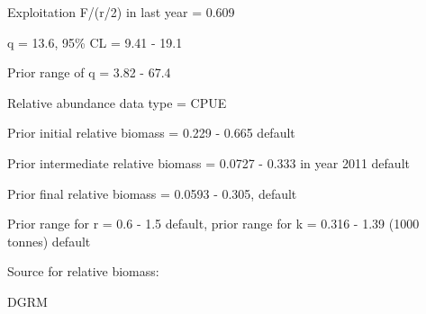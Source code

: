 \documentclass[12pt,a4paper]{article}\usepackage[]{graphicx}\usepackage[]{xcolor}
\begin{document}
Exploitation F/(r/2) in last year = 0.609

q = 13.6, 95\% CL = 9.41 - 19.1

Prior range of q = 3.82 - 67.4

Relative abundance data type = CPUE

Prior initial relative biomass = 0.229 - 0.665 default

Prior intermediate relative biomass = 0.0727 - 0.333 in year 2011 default

Prior final relative biomass = 0.0593 - 0.305, default

Prior range for r = 0.6 - 1.5 default, prior range for k = 0.316 - 1.39 (1000 tonnes) default

Source for relative biomass: 

DGRM

    
\end{document}
